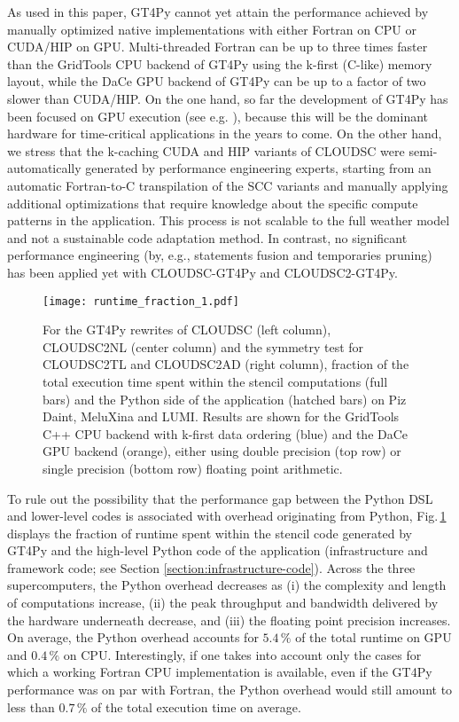 \documentclass[main.tex]{subfiles}
\begin{document}
        As used in this paper, GT4Py cannot yet attain the performance achieved by manually optimized native implementations with either Fortran on CPU or CUDA/HIP on GPU. Multi-threaded Fortran can be up to three times faster than the GridTools CPU backend of GT4Py using the k-first (C-like) memory layout, while the DaCe GPU backend of GT4Py can be up to a factor of two slower than CUDA/HIP. On the one hand, so far the development of GT4Py has been focused on GPU execution (see e.g. \cite{dahm23}), because this will be the dominant hardware for time-critical applications in the years to come. On the other hand, we stress that the k-caching CUDA and HIP variants of CLOUDSC were semi-automatically generated by performance engineering experts, starting from an automatic Fortran-to-C transpilation of the SCC variants and manually applying additional optimizations that require knowledge about the specific compute patterns in the application. This process is not scalable to the full weather model and not a sustainable code adaptation method. In contrast, no significant performance engineering (by, e.g., statements fusion and temporaries pruning) has been applied yet with CLOUDSC-GT4Py and CLOUDSC2-GT4Py.

        \begin{figure}[t!]
            \centering
            \texttt{[image: runtime\_fraction\_1.pdf]}
            \caption{For the GT4Py rewrites of CLOUDSC (left column), CLOUDSC2NL (center column) and the symmetry test for CLOUDSC2TL and CLOUDSC2AD (right column), fraction of the total execution time spent within the stencil computations (full bars) and the Python side of the application (hatched bars) on Piz Daint, MeluXina and LUMI. Results are shown for the GridTools C++ CPU backend with k-first data ordering (blue) and the DaCe GPU backend (orange), either using double precision (top row) or single precision (bottom row) floating point arithmetic.}
            \label{fig:runtime-fraction}
        \end{figure}

        To rule out the possibility that the performance gap between the Python DSL and lower-level codes is associated with overhead originating from Python, Fig.\,\ref{fig:runtime-fraction} displays the fraction of runtime spent within the stencil code generated by GT4Py and the high-level Python code of the application (infrastructure and framework code; see Section \ref{section:infrastructure-code}). Across the three supercomputers, the Python overhead decreases as (i) the complexity and length of computations increase, (ii) the peak throughput and bandwidth delivered by the hardware underneath decrease, and (iii) the floating point precision increases. On average, the Python overhead accounts for $5.4\,\%$ of the total runtime on GPU and $0.4\,\%$ on CPU. Interestingly, if one takes into account only the cases for which a working Fortran CPU implementation is available, even if the GT4Py performance was on par with Fortran, the Python overhead would still amount to less than $0.7\,\%$ of the total execution time on average.
\end{document}
